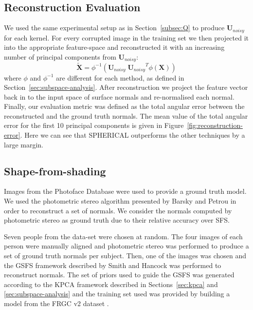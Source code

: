 \subsection{Reconstruction Evaluation}
We used the same experimental setup as in Section~\ref{subsec:Q} to produce $\boldsymbol{U}_{noisy}$ for each kernel. For every corrupted image in the training set we then projected it into the appropriate feature-space and reconstructed it with an increasing number of principal components from $\boldsymbol{U}_{noisy}$:
\begin{equation}\label{eq:xtilde}
    \tilde{\boldsymbol{X}} = \phi^{-1} \left( \boldsymbol{U}_{noisy} \; {\boldsymbol{U}_{noisy}}^T \phi(\boldsymbol{X}) \right)
\end{equation}
where $\phi$ and $\phi^{-1}$ are different for each method, as defined in Section~\ref{sec:subspace-analysis}. After reconstruction we project the feature vector back in to the input space of surface normals and re-normalised each normal. Finally, our evaluation metric was defined as the total angular error between the reconstructed and the ground truth normals.
The mean value of the total angular error for the first 10 principal components is given in Figure~\ref{fig:reconstruction-error}. Here we can see that SPHERICAL outperforms the other techniques by a large margin.
\subsection{Shape-from-shading}
Images from the Photoface Database \cite{RefWorks:202} were used to provide a ground truth model. We used the photometric stereo algorithm presented by Barsky and Petrou \cite{RefWorks:108} in order to reconstruct a set of normals. We consider the normals computed by photometric stereo as ground truth due to their relative accuracy over SFS.

Seven people from the data-set were chosen at random. The four images of each person were manually aligned and photometric stereo was performed to produce a set of ground truth normals per subject. Then, one of the images was chosen and the GSFS framework described by Smith and Hancock \cite{RefWorks:86,RefWorks:90} was performed to reconstruct normals. The set of priors used to guide the GSFS was generated according to the KPCA framework described in Sections~\ref{sec:kpca} and \ref{sec:subspace-analysis} and the training set used was provided by building a model from the FRGC v2 dataset \cite{RefWorks:251}.

